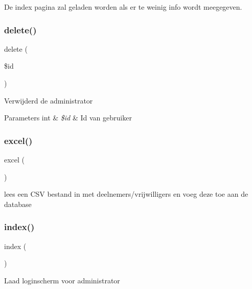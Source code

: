 De index pagina zal geladen worden als er te weinig info wordt meegegeven. \mbox{\label{class_admin_a2f8258add505482d7f00ea26493a5723}} 
\subsubsection{\texorpdfstring{delete()}{delete()}}
{\footnotesize\ttfamily delete (\begin{DoxyParamCaption}\item[{}]{\$id }\end{DoxyParamCaption})}

Verwijderd de administrator 
\begin{DoxyParams}[1]{Parameters}
int & {\em \$id} & Id van gebruiker \\
\hline
\end{DoxyParams}
\mbox{\label{class_admin_ab619c12069c76b755a2ceae543d527fe}} 
\subsubsection{\texorpdfstring{excel()}{excel()}}
{\footnotesize\ttfamily excel (\begin{DoxyParamCaption}{ }\end{DoxyParamCaption})}



lees een C\+SV bestand in met deelnemers/vrijwilligers en voeg deze toe aan de database 

\mbox{\label{class_admin_a149eb92716c1084a935e04a8d95f7347}} 
\subsubsection{\texorpdfstring{index()}{index()}}
{\footnotesize\ttfamily index (\begin{DoxyParamCaption}{ }\end{DoxyParamCaption})}

Laad loginscherm voor administrator \mbox{\label{class_admin_a3ea73f2d243749d401f168a6dc356528}} 
